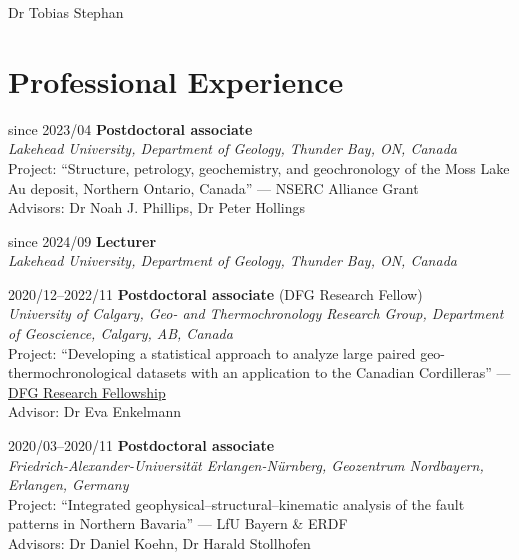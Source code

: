 \documentclass[10pt, paper=letter]{scrartcl} %
\begin{document}
\begin{cv}{\textsf{Dr Tobias Stephan}}
    \section{Professional Experience}
    \begin{cvlist}{}
        \item[since 2023/04] \textbf{Postdoctoral associate}\\ \textit{Lakehead University,
            Department of Geology, Thunder Bay, ON, Canada}\\ Project: \enquote{Structure,
            petrology, geochemistry, and geochronology of the Moss Lake Au deposit,
            Northern Ontario, Canada} --- NSERC Alliance Grant\\ Advisors: Dr Noah J.
        Phillips, Dr Peter Hollings
        
        \item[since 2024/09] \textbf {Lecturer}\\ \textit{Lakehead University, Department of
            Geology, Thunder Bay, ON, Canada}       

        \item[2020/12--2022/11] \textbf{Postdoctoral associate} (DFG Research Fellow)\\
        \textit{University of Calgary, Geo- and Thermochronology Research Group, Department of Geoscience, Calgary, AB, Canada}\\
        Project:
        \enquote{Developing a statistical approach to analyze large paired geo-thermochronological datasets with an application to the Canadian Cordilleras} --- \href{https://gepris.dfg.de/gepris/projekt/439621066?language=en}{DFG Research Fellowship}\\
        Advisor: Dr Eva Enkelmann

        \item[2020/03--2020/11] \textbf{Postdoctoral associate}\\
        \textit{
            Friedrich-Alexander-Universit\"at Erlangen-N\"urnberg, Geozentrum Nordbayern, \mbox{Erlangen}, Germany} \\ Project: \enquote{Integrated geophysical–structural–kinematic analysis of the fault patterns in Northern Bavaria} --- LfU Bayern \& ERDF\\
        Advisors: Dr Daniel Koehn, Dr Harald Stollhofen


\end{cvlist}
\end{cv}
\end{document}
